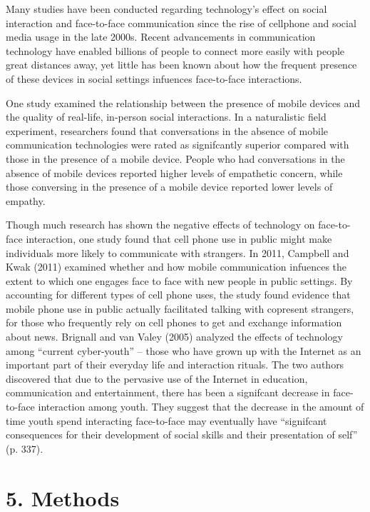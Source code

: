 \documentclass[11pt]{article} %
\begin{document}
Many studies have been conducted regarding technology’s effect on social interaction and face-to-face communication since the rise of cellphone and social media usage in the late 2000s.
Recent advancements in communication technology have enabled billions of people to connect more easily with people great distances away, yet little has been known about how the frequent presence of these devices in social settings infuences face-to-face interactions.

One study examined the relationship between the presence of mobile devices and the quality of real-life, in-person social interactions. In a naturalistic field experiment, researchers found that conversations in the absence of mobile communication technologies were rated as signifcantly superior compared with those in the presence of a mobile device. People who had conversations in the absence of mobile devices reported higher levels of empathetic concern, while those conversing in the presence of a mobile device reported lower levels of empathy. 

Though much research has shown the negative effects of technology on face-to-face interaction, one study found that cell phone use in public might make individuals more likely to communicate with strangers. 
In 2011, Campbell and Kwak (2011) examined whether and how mobile communication infuences the extent to which one engages face to face with new people in public settings. By accounting for different types of cell phone uses, the study found evidence that mobile phone use in public actually facilitated talking with copresent strangers, for those who frequently rely on cell phones to get and exchange information about news.
Brignall and van Valey (2005) analyzed the effects of technology among “current cyber-youth” – those who have grown up with the Internet as an important part of their everyday life and interaction rituals. The two authors discovered that due to the pervasive use of the Internet in education, communication and entertainment, there has been a signifcant decrease in face-to-face interaction among youth. They suggest that the decrease in the amount of time youth spend interacting face-to-face may eventually have “signifcant consequences for their development of social skills and their presentation of self” (p. 337). 

\section{5. Methods}
\end{document}
